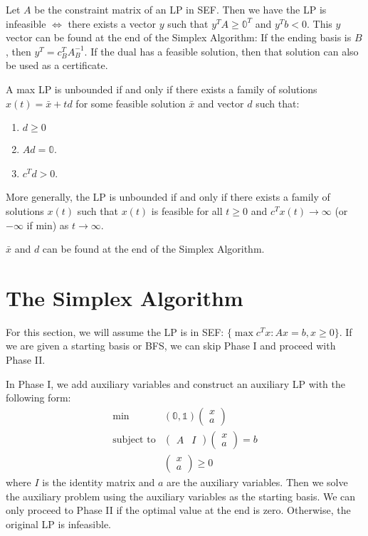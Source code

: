 \documentclass[a4paper]{report}
\newcommand\m[1]{\begin{pmatrix}#1\end{pmatrix}}
\begin{document}
\begin{definition}\label{infeasibility}
  Let $A$ be the constraint matrix of an LP in SEF. Then we have the LP is infeasible $\Longleftrightarrow$ there exists a vector $y$ such that $y^T A \geq \mathbb 0^T$ and $y^T b < 0$. This $y$ vector can be found at the end of the Simplex Algorithm: If the ending basis is $B$, then $y^T = c_B^T A_B^{-1}$. If the dual has a feasible solution, then that solution can also be used as a certificate.
\end{definition}

\begin{definition}\label{unboundedness}
  A max LP is unbounded if and only if there exists a family of solutions $x(t) = \bar x + td$ for some feasible solution $\bar x$ and vector $d$ such that:
  \begin{enumerate}
    \item $d \geq 0$
    \item $Ad = \mathbb 0$.
    \item $c^T d > 0$.
  \end{enumerate}

  More generally, the LP is unbounded if and only if there exists a family of solutions $x(t)$ such that $x(t)$ is feasible for all $t \geq 0$ and $c^Tx(t) \rightarrow \infty$ (or $-\infty$ if min) as $t \rightarrow \infty$.
  
  $\bar x$ and $d$ can be found at the end of the Simplex Algorithm.
\end{definition}

\section{The Simplex Algorithm}
For this section, we will assume the LP is in SEF: $\{\max c^T x : Ax = b, x \geq 0\}$. If we are given a starting basis or BFS, we can skip Phase I and proceed with Phase II. 

\begin{definition}\label{phase:i}
  In Phase I, we add auxiliary variables and construct an auxiliary LP with the following form:
  \begin{equation*}
    \begin{aligned}
      \min & (\mathbb 0, \mathbb 1) \m{x \\ a} \\
      \text{subject to} & \m{A & I} \m{x \\ a} = b \\
      & \m{x \\ a} \geq 0
    \end{aligned}
  \end{equation*}
  where $I$ is the identity matrix and $a$ are the auxiliary variables. Then we solve the auxiliary problem using the auxiliary variables as the starting basis. We can only proceed to Phase II if the optimal value at the end is zero. Otherwise, the original LP is infeasible.
\end{definition}
\end{document}
